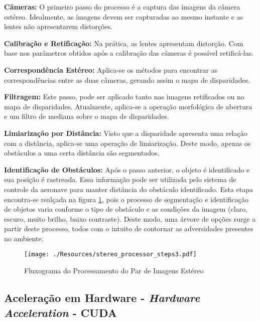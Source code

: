\textbf{Câmeras:} O primeiro passo do processo é a captura das imagens da câmera estéreo. Idealmente, as imagens devem ser capturadas ao mesmo instante e as lentes não apresentarem distorções.   

\textbf{Calibração e Retificação:} Na prática, as lentes apresentam distorção. Com base nos parâmetros obtidos após a calibração das câmeras é possível retificá-las. 

\textbf{Correspondência Estéreo:} Aplica-se os métodos para encontrar as correspondências entre as duas câmeras, gerando assim o mapa de disparidades.

\textbf{Filtragem:} Este passo, pode ser aplicado tanto nas imagens retificados ou no mapa de disparidades. Atualmente, aplica-se a operação morfológica de abertura e um filtro de mediana sobre o mapa de disparidades. 

\textbf{Limiarização por Distância:} Visto que a disparidade apresenta uma relação com a distância, aplica-se uma operação de limiarização. Deste modo, apenas os obstáculos a uma certa distância são segmentados.

\textbf{Identificação de Obstáculos:} Após o passo anterior, o objeto é identificado e sua posição é rastreada. Essa informação pode ser utilizada pelo sistema de controle da aeronave para manter distância do obstáculo identificado. Esta etapa encontra-se realçada na figura \ref{stereo_processor_steps}, pois o processo de segmentação e identificação de objetos varia conforme o tipo de obstáculo e as condições da imagem (claro, escuro, muito brilho, baixo contraste). Deste modo, uma árvore de opções surge a partir deste processo, todos com o intuito de contornar as adversidades presentes no ambiente.

\begin{figure}[H]
	\centering
	\texttt{[image: ./Resources/stereo\_processor\_steps3.pdf]}
	\caption{Fluxograma do Processamento do Par de Imagens Estéreo}
	\label{stereo_processor_steps}
\end{figure}


\subsection{Aceleração em Hardware - \textit{Hardware Acceleration} - CUDA}

